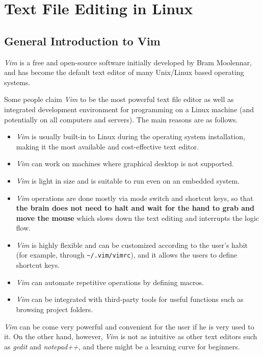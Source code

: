 \chapter{Text File Editing in Linux}

\section{General Introduction to Vim}

\textit{Vim} is a free and open-source software initially developed by Bram Moolennar, and has become the default text editor of many Unix/Linux based operating systems.

Some people claim \textit{Vim} to be the most powerful text file editor as well as integrated development environment for programming on a Linux machine (and potentially on all computers and servers). The main reasons are as follows.
\begin{itemize}
  \item \textit{Vim} is usually built-in to Linux during the operating system installation, making it the most available and cost-effective text editor.
  \item \textit{Vim} can work on machines where graphical desktop is not supported.
  \item \textit{Vim} is light in size and is suitable to run even on an embedded system.
  \item \textit{Vim} operations are done mostly via mode switch and shortcut keys, so that \textbf{the brain does not need to halt and wait for the hand to grab and move the mouse} which slows down the text editing and interrupts the logic flow.
  \item \textit{Vim} is highly flexible and can be customized according to the user's habit (for example, through \verb|~/.vim/vimrc|), and it allows the users to define shortcut keys.
  \item \textit{Vim} can automate repetitive operations by defining macros.
  \item \textit{Vim} can be integrated with third-party tools for useful functions such as browsing project folders.
\end{itemize}
\textit{Vim} can be come very powerful and convenient for the user if he is very used to it. On the other hand, however, \textit{Vim} is not as intuitive as other text editors such as \textit{gedit} and \textit{notepad++}, and there might be a learning curve for beginners.


